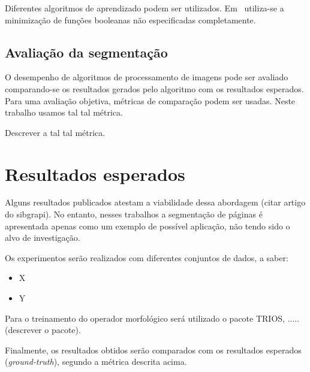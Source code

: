 \documentclass[times, 10pt,twocolumn]{article}
\begin{document}
Diferentes algoritmos de aprendizado podem ser
utilizados. Em~\cite{Tomita:1996:PrAuMa} utiliza-se a minimização de
funções booleanas não especificadas completamente.


\subsection{Avaliação da segmentação}

O desempenho de algoritmos de processamento de imagens pode ser
avaliado comparando-se os resultados gerados pelo algoritmo com os
resultados esperados. Para uma avaliação objetiva, métricas de
comparação podem ser usadas. Neste trabalho usamos tal tal métrica.

Descrever a tal tal métrica.


\section{Resultados esperados}

Alguns resultados publicados atestam a viabilidade dessa abordagem
(citar artigo do sibgrapi). No entanto, nesses trabalhos a segmentação
de páginas é apresentada apenas como um exemplo de possível aplicação,
não tendo sido o alvo de investigação.

Os experimentos serão realizados com  diferentes conjuntos de dados, a
saber:

\begin{itemize}
\item X
\item Y
\end{itemize}

Para o treinamento do operador morfológico será utilizado o pacote
TRIOS, ..... (descrever o pacote).

Finalmente, os resultados obtidos serão comparados com os resultados
esperados (\emph{ground-truth}), segundo a métrica descrita acima.


{\small 
}
\end{document}
